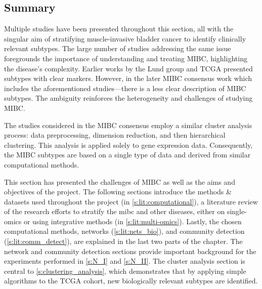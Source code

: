 
\subsection{Summary}

Multiple studies have been presented throughout this section, all with the singular aim of stratifying muscle-invasive bladder cancer to identify clinically relevant subtypes. The large number of studies addressing the same issue foregrounds the importance of understanding and treating MIBC, highlighting the disease's complexity. Earlier works by the Lund group \citep{Sjodahl2017-xr,Marzouka2018-ge} and TCGA \citep{Tcga2014-dr,Robertson2017-mg} presented subtypes with clear markers. However, in the later MIBC consensus work \citep{Kamoun2020-tj} which includes the aforementioned studies—there is a less clear description of MIBC subtypes. The ambiguity reinforces the heterogeneity and challenges of studying MIBC.

The studies considered in the MIBC consensus employ a similar cluster analysis process: data preprocessing, dimension reduction, and then hierarchical clustering. This analysis is applied solely to gene expression data. Consequently, the MIBC subtypes are based on a single type of data and derived from similar computational methods.


This section has presented the challenges of MIBC as well as the aims and objectives of the project. The following sections introduce the methods \& datasets used throughout the project (in \cref{s:lit:computational}), a literature review of the research efforts to stratify the \acrshort{mibc} and other diseases, either on single-omics or using integrative methods (in \cref{s:lit:multi-omics}). Lastly, the chosen computational methods, networks (\cref{s:lit:nets_bio}), and community detection (\cref{s:lit:comm_detect}), are explained in the last two parts of the chapter. The network and community detection sections provide important background for the experiments performed in \cref{s:N_I} and \cref{s:N_II}. The cluster analysis section is central to \cref{s:clustering_analysis}, which demonstrates that by applying simple algorithms to the TCGA cohort, new biologically relevant subtypes are identified.



